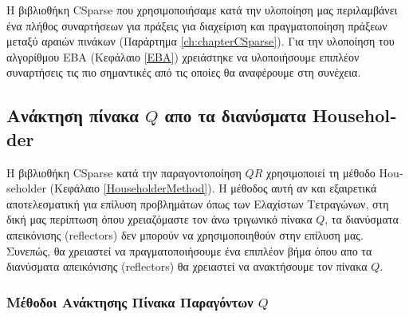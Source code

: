 Η βιβλιοθήκη \textlatin{CSparse} που χρησιμοποιήσαμε κατά την υλοποίηση μας περιλαμβάνει ένα πλήθος συναρτήσεων για πράξεις για διαχείριση και πραγματοποίηση πράξεων μεταξύ αραιών πινάκων (Παράρτημα \ref{ch:chapterCSparse}). Για την υλοποίηση του αλγορίθμου \textlatin{EBA} (Κεφάλαιο \ref{EBA}) χρειάστηκε να υλοποιήσουμε επιπλέον συναρτήσεις τις πιο σημαντικές από τις οποίες θα αναφέρουμε στη συνέχεια.

\subsection{Ανάκτηση πίνακα $Q$ απο τα διανύσματα \textlatin{Householder}}

Η βιβλιοθήκη \textlatin{CSparse} κατά την παραγοντοποίηση $QR$ χρησιμοποιεί τη μέθοδο \textlatin{Householder} (Κεφάλαιο \ref{HouseholderMethod}). Η μέθοδος αυτή αν και εξαιρετικά αποτελεσματική για επίλυση προβλημάτων όπως των Ελαχίστων Τετραγώνων, στη δική μας περίπτωση όπου χρειαζόμαστε τον άνω τριγωνικό πίνακα $Q$, τα διανύσματα απεικόνισης (\textlatin{reflectors}) δεν μπορούν να χρησιμοποιηθούν στην επίλυση μας. Συνεπώς, θα χρειαστεί να πραγματοποιήσουμε ένα επιπλέον βήμα όπου απο τα διανύσματα απεικόνισης (\textlatin{reflectors}) θα χρειαστεί να ανακτήσουμε τον πίνακα $Q$.

\subsubsection{Μέθοδοι Ανάκτησης Πίνακα Παραγόντων $Q$}

